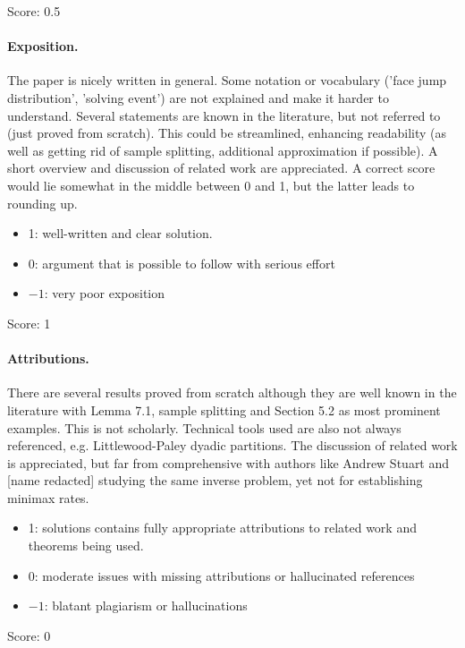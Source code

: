 \documentclass[11pt]{article}
\theoremstyle{remark}
\begin{document}
\noindent Score: 0.5

\paragraph{Exposition.}

The paper is nicely written in general. Some notation or vocabulary ('face jump distribution', 'solving event') are not explained and make it harder to understand. Several statements are known in the literature, but not referred to (just proved from scratch). This could be streamlined, enhancing readability (as well as getting rid of sample splitting, additional approximation if possible). A short overview and discussion of related work are appreciated. A correct score would lie somewhat in the middle between 0 and 1, but the latter leads to rounding up.

\begin{itemize}
	\item  1: well-written and clear solution.
	\item  0: argument that is possible to follow with serious effort
	\item  $-1$: very poor exposition
\end{itemize}

\noindent Score: 1

\paragraph{Attributions.} There are several results proved from scratch although they are well known in the literature with Lemma 7.1, sample splitting and Section 5.2 as most prominent examples. This is not scholarly. Technical tools used are also not always referenced, e.g. Littlewood-Paley dyadic partitions. The discussion of related work is appreciated, but far from comprehensive with authors like Andrew Stuart and [name redacted] studying the same inverse problem, yet not for establishing minimax rates.
\begin{itemize}
	\item  1: solutions contains fully appropriate attributions
		to related work and theorems being used.
	\item  0: moderate issues with missing attributions or hallucinated references
	\item  $-1$: blatant plagiarism or hallucinations
\end{itemize}

\noindent Score: 0
\end{document}
